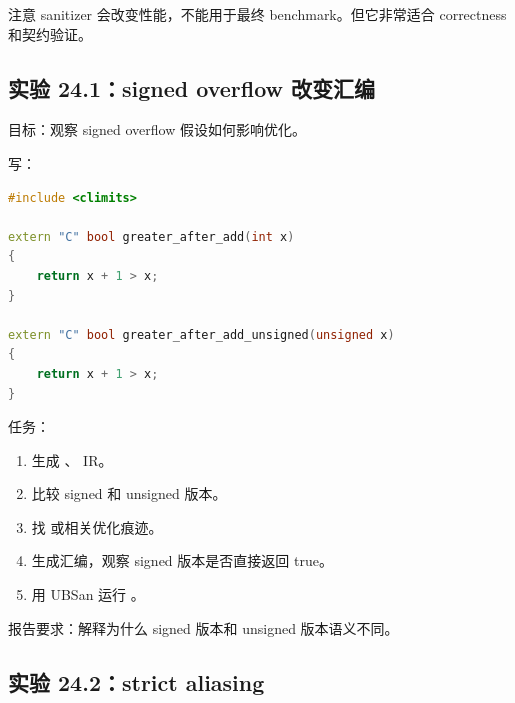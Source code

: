 注意 sanitizer 会改变性能，不能用于最终 benchmark。但它非常适合 correctness 和契约验证。

\subsection{实验 24.1：signed overflow 改变汇编}

\begin{labbox}
目标：观察 signed overflow 假设如何影响优化。

写：

\begin{lstlisting}[language=C++]
#include <climits>

extern "C" bool greater_after_add(int x)
{
    return x + 1 > x;
}

extern "C" bool greater_after_add_unsigned(unsigned x)
{
    return x + 1 > x;
}
\end{lstlisting}

任务：

\begin{enumerate}
  \item 生成 、 IR。
  \item 比较 signed 和 unsigned 版本。
  \item 找  或相关优化痕迹。
  \item 生成汇编，观察 signed 版本是否直接返回 true。
  \item 用 UBSan 运行 。
\end{enumerate}

报告要求：解释为什么 signed 版本和 unsigned 版本语义不同。
\end{labbox}

\subsection{实验 24.2：strict aliasing}

